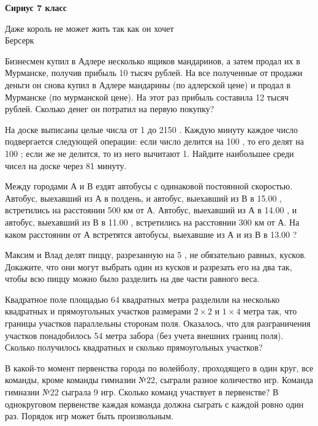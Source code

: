 \centerline{\bf \Huge Сириус 7 класс}

\begin{flushright}
        \scriptsize{Даже король не может жить так как он хочет\\ Берсерк}
\end{flushright}

Бизнесмен купил в Адлере несколько ящиков мандаринов, а затем продал их в Мурманске, получив прибыль 10 тысяч рублей. На все полученные от продажи деньги он снова купил в Адлере мандарины (по адлерской цене) и продал в Мурманске (по мурманской цене). На этот раз прибыль составила 12 тысяч рублей. Сколько денег он потратил на первую покупку?

На доске выписаны целые числа от 1 до 2150 . Каждую минуту каждое число подвергается следующей операции: если число делится на 100 , то его делят на 100 ; если же не делится, то из него вычитают 1. Найдите наибольшее среди чисел на доске через 81 минуту.

Между городами А и В ездят автобусы с одинаковой постоянной скоростью. Автобус, выехавший из А в полдень, и автобус, выехавший из В в 15.00 , встретились на расстоянии 500 км от А. Автобус, выехавший из А в 14.00 , и автобус, выехавший из В в 11.00 , встретились на расстоянии 300 км от А. На каком расстоянии от А встретятся автобусы, выехавшие из А и из В в 13.00 ?

Максим и Влад делят пиццу, разрезанную на 5 , не обязательно равных, кусков. Докажите, что они могут выбрать один из кусков и разрезать его на два так, чтобы всю пиццу можно было разделить на две части равного веса.

Квадратное поле площадью 64 квадратных метра разделили на несколько квадратных и прямоугольных участков размерами $2 \times 2$ и $1 \times 4$ метра так, что границы участков параллельны сторонам поля. Оказалось, что для разграничения участков понадобилось 54 метра забора (без учета внешних границ поля). Сколько получилось квадратных и сколько прямоугольных участков?

В какой-то момент первенства города по волейболу, проходящего в один круг, все команды, кроме команды гимназии №22, сыграли разное количество игр. Команда гимназии №22 сыграла 9 игр. Сколько команд участвует в первенстве? В однокруговом первенстве каждая команда должна сыграть с каждой ровно один раз. Порядок игр может быть произвольным.
